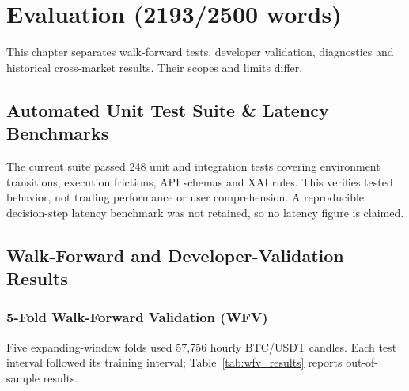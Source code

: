 \documentclass[11pt,a4paper]{article}
\begin{document}
\section{Evaluation (2193/2500 words)}
This chapter separates walk-forward tests, developer validation, diagnostics and historical cross-market results. Their scopes and limits differ.

\subsection{Automated Unit Test Suite \& Latency Benchmarks}
The current suite passed 248 unit and integration tests covering environment transitions, execution frictions, API schemas and XAI rules. This verifies tested behavior, not trading performance or user comprehension. A reproducible decision-step latency benchmark was not retained, so no latency figure is claimed.

\subsection{Walk-Forward and Developer-Validation Results}

\subsubsection{5-Fold Walk-Forward Validation (WFV)}
Five expanding-window folds used 57,756 hourly BTC/USDT candles. Each test interval followed its training interval; Table~\ref{tab:wfv_results} reports out-of-sample results.
\end{document}
